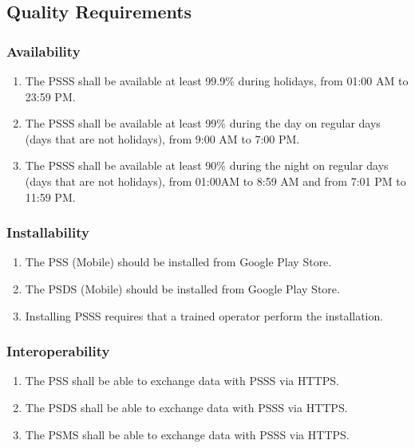 \subsection{Quality Requirements}
\subsubsection{Availability}
\begin{enumerate}[label=AVL-\arabic*]
    \item The PSSS shall be available at least 99.9\% during holidays, 
    from 01:00 AM to 23:59 PM.
    \item The PSSS shall be available at least 99\% during the day on regular 
    days (days that are not holidays), from 9:00 AM to 7:00 PM.
    \item The PSSS shall be available at least 90\% during 
    the night on regular days (days that are not holidays), from 
    01:00AM to 8:59 AM and from 7:01 PM to 11:59 PM.
\end{enumerate}

\subsubsection{Installability}
\begin{enumerate}[label=INS-\arabic*]
    \item The PSS (Mobile) should be installed from Google Play Store.
    \item The PSDS (Mobile) should be installed from Google Play Store.
    \item Installing PSSS requires that a trained operator perform 
    the installation.
\end{enumerate}

\subsubsection{Interoperability}
\begin{enumerate}[label=IOP-\arabic*]
    \item The PSS shall be able to exchange data with PSSS via HTTPS.
    \item The PSDS shall be able to exchange data with PSSS via HTTPS.
    \item The PSMS shall be able to exchange data with PSSS via HTTPS.
\end{enumerate}
\pagebreak
